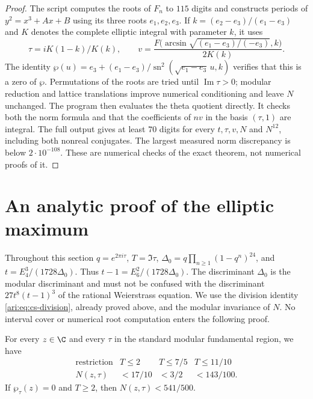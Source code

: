 \begin{proof}
The script  computes the
roots of $F_n$ to $115$ digits and constructs periods of
$y^2=x^3+Ax+B$ using its three roots $e_1,e_2,e_3$. If
$k=(e_2-e_3)/(e_1-e_3)$ and $K$ denotes the complete elliptic
integral with parameter $k$, it uses
\[
 \tau=iK(1-k)/K(k),\qquad
 v=\frac{F\bigl(\arcsin\sqrt{(e_1-e_3)/(-e_3)},k\bigr)}{2K(k)}.
\]
The identity
$\wp(u)=e_3+(e_1-e_3)/\operatorname{sn}^2
(\sqrt{e_1-e_3}\,u,k)$ verifies that this is a zero of $\wp$.
Permutations of the roots are tried until $\operatorname{Im}\tau>0$;
modular reduction and lattice translations improve numerical
conditioning and leave $N$ unchanged. The program then evaluates
the theta quotient directly. It checks both the norm formula and
that the coefficients of $nv$ in the basis $(\tau,1)$ are integral.
The full output gives at least $70$ digits for every $t,\tau,v,N$
and $N^{12}$, including both nonreal conjugates. The largest measured
norm discrepancy is below $2\cdot10^{-108}$. These are numerical
checks of the exact theorem, not numerical proofs of it.
\end{proof}


\section{An analytic proof of the elliptic maximum}

Throughout this section $q=e^{2\pi i\tau}$, $T=\Im\tau$,
$\Delta_0=q\prod_{n\ge1}(1-q^n)^{24}$, and
$t=E_4^3/(1728\Delta_0)$. Thus $t-1=E_6^2/(1728\Delta_0)$.
The discriminant $\Delta_0$ is the modular discriminant and must not
be confused with the discriminant $27t^8(t-1)^3$ of the rational
Weierstrass equation. We use the division identity
\eqref{ari:eq:cs-division}, already proved above, and the modular
invariance of $N$. No interval cover or numerical root computation
enters the following proof.

\begin{proposition}\label{ari:C.8.1}
For every $z\in\C$ and every $\tau$ in the standard modular
fundamental region, we have
\[
 \begin{array}{c|ccc}
 \text{restriction}&T\le2&T\le7/5&T\le11/10\\ \hline
 N(z,\tau)&<17/10&<3/2&<143/100.
 \end{array}
\]
If $\wp_\tau(z)=0$ and $T\ge2$, then $N(z,\tau)<541/500$.
\end{proposition}

